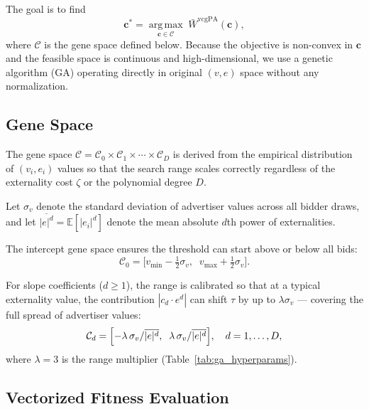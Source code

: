 \documentclass[11pt]{article}
\newcommand{\bsc}{\mathbf{c}}
\begin{document}
The goal is to find
\begin{equation}
    \bsc^* = \operatorname*{arg\,max}_{\bsc \in \mathcal{C}}\;
             \bar{W}^{\text{vcgPA}}(\bsc),
\end{equation}
where $\mathcal{C}$ is the gene space defined below.  Because the objective is
non-convex in $\bsc$ and the feasible space is continuous and high-dimensional,
we use a genetic algorithm (GA) operating directly in original $(v, e)$ space
without any normalization.

\subsection{Gene Space}
\label{sec:gene_space}

The gene space $\mathcal{C} = \mathcal{C}_0 \times \mathcal{C}_1 \times \cdots \times \mathcal{C}_D$
is derived from the empirical distribution of $(v_i, e_i)$ values so that the
search range scales correctly regardless of the externality cost $\zeta$ or the
polynomial degree $D$.

Let $\sigma_v$ denote the standard deviation of advertiser values across all
bidder draws, and let $\overline{|e|^d} = \mathbb{E}[|e_i|^d]$ denote the
mean absolute $d$th power of externalities.

The intercept gene space ensures the threshold can start above or below all bids:
\begin{equation}
    \mathcal{C}_0 = \bigl[v_{\min} - \tfrac{1}{2}\sigma_v,\;\;
                          v_{\max} + \tfrac{1}{2}\sigma_v\bigr].
    \label{eq:gene0}
\end{equation}

For slope coefficients ($d \geq 1$), the range is calibrated so that at a typical
externality value, the contribution $|c_d \cdot e^d|$ can shift $\tau$ by up to
$\lambda \sigma_v$ — covering the full spread of advertiser values:
\begin{equation}
    \mathcal{C}_d = \Bigl[{-\lambda\,\sigma_v}/{\overline{|e|^d}},\;\;
                           {\lambda\,\sigma_v}/{\overline{|e|^d}}\Bigr],
    \quad d = 1, \ldots, D,
    \label{eq:gened}
\end{equation}
where $\lambda = 3$ is the range multiplier (Table~\ref{tab:ga_hyperparams}).

\subsection{Vectorized Fitness Evaluation}
\end{document}
